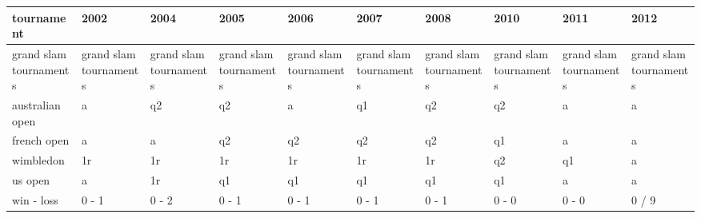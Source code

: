 \documentclass{article}
\begin{document}
\begin{tabular}{llllllllll}
\toprule
tournament & 2002 & 2004 & 2005 & 2006 & 2007 & 2008 & 2010 & 2011 & 2012 \\
\midrule
grand slam tournaments & grand slam tournaments & grand slam tournaments & grand slam tournaments & grand slam tournaments & grand slam tournaments & grand slam tournaments & grand slam tournaments & grand slam tournaments & grand slam tournaments \\
australian open & a & q2 & q2 & a & q1 & q2 & q2 & a & a \\
french open & a & a & q2 & q2 & q2 & q2 & q1 & a & a \\
wimbledon & 1r & 1r & 1r & 1r & 1r & 1r & q2 & q1 & a \\
us open & a & 1r & q1 & q1 & q1 & q1 & q1 & a & a \\
win - loss & 0 - 1 & 0 - 2 & 0 - 1 & 0 - 1 & 0 - 1 & 0 - 1 & 0 - 0 & 0 - 0 & 0 / 9 \\
\bottomrule
\end{tabular}
\end{document}
